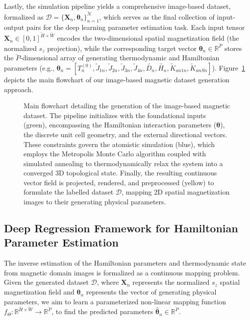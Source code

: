 \documentclass[final,5p,times,twocolumn]{elsarticle}
\begin{document}
Lastly, the simulation pipeline yields a comprehensive image-based dataset, formalized as $\mathcal{D} = \{\mathbf{X}_n, \boldsymbol{\theta}_n\}_{n=1}^{\breve{N}}$, which serves as the final collection of input-output pairs for the deep learning parameter estimation task. Each input tensor $\mathbf{X}_n \in [0,1]^{\breve{H} \times \breve{W}}$ encodes the two-dimensional spatial magnetization field (the normalized $s_z$ projection), while the corresponding target vector $\boldsymbol{\theta}_n \in \mathbb{R}^{\breve{P}}$ stores the $\breve{P}$-dimensional array of generating thermodynamic and Hamiltonian parameters (e.g., $\boldsymbol{\theta}_n = [T^{(0)}_n,\tilde{J}_{1n},\tilde{J}_{2n},\tilde{J}_{3n},\tilde{J}_{4n},\tilde{D_n},\tilde{H_n},\tilde{K}_{an1n},\tilde{K}_{anSn}]$). Figure~\ref{fig:methodology_flowchart} depicts the main flowchart of our image-based magnetic dataset generation approach.

\begin{figure}[t!]
    \centering
    \resizebox{\linewidth}{!}{
    }
 \caption{Main flowchart detailing the generation of the image-based magnetic dataset. The pipeline initializes with the foundational inputs (green), encompassing the Hamiltonian interaction parameters ($\boldsymbol{\theta}$), the discrete unit cell geometry, and the external directional vectors. These constraints govern the atomistic simulation (blue), which employs the Metropolis Monte Carlo algorithm coupled with simulated annealing to thermodynamically relax the system into a converged 3D topological state. Finally, the resulting continuous vector field is projected, rendered, and preprocessed (yellow) to formulate the labelled dataset $\mathcal{D}$, mapping 2D spatial magnetization images to their generating physical parameters.}
    \label{fig:methodology_flowchart}
\end{figure}

\subsection{Deep Regression Framework for Hamiltonian Parameter Estimation}\label{sec:Deep_Learning}

The inverse estimation of the Hamiltonian parameters and thermodynamic state from magnetic domain images is formalized as a continuous mapping problem. Given the generated dataset $\mathcal{D}$, where $\mathbf{X}_n$ represents the normalized $s_z$ spatial magnetization field and $\boldsymbol{\theta}_n$ represents the vector of generating physical parameters, we aim to learn a parameterized non-linear mapping function $f_\Theta : \mathbb{R}^{\breve{H} \times \breve{W}} \rightarrow \mathbb{R}^{\breve{P}}$, to find the predicted parameters $\hat{\boldsymbol{\theta}}_n\in\mathbb{R}^{\breve{P}}.$
\end{document}
